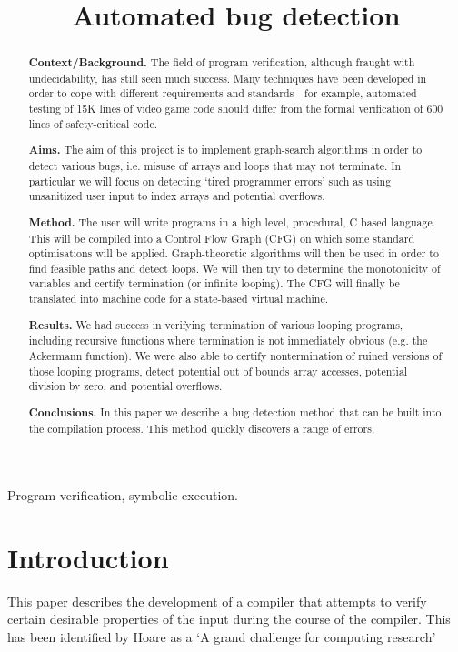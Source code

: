 \documentclass[12pt,a4paper]{article}
\title{Automated bug detection}
\author{} %
\date{}
\begin{document}
\maketitle

\begin{abstract}
\par
{\bf Context/Background.} The field of program verification, although fraught with undecidability, has still seen much success. Many techniques have been developed in order to
cope with different requirements and standards - for example, automated testing of 15K lines of video game code should differ from the formal verification of 600 lines
of safety-critical code.

{\bf Aims.} The aim of this project is to implement graph-search algorithms in order to detect various bugs, i.e. misuse of arrays and loops that may not terminate. In particular we will focus on detecting `tired programmer errors' such as using unsanitized user input to index arrays and potential overflows.

{\bf Method.} The user will write programs in a high level, procedural, C based language. This will be compiled into a Control Flow Graph (CFG) on which some standard
optimisations will be applied. Graph-theoretic algorithms will then be used in order to find feasible paths and detect loops.
We will then try to determine the monotonicity of variables and certify termination (or 
infinite looping). The CFG will finally be translated into machine code for a state-based virtual machine.

{\bf Results.} We had success in verifying termination of various looping programs, including recursive functions where termination is not immediately obvious (e.g. the Ackermann function). We were also able to certify nontermination of ruined versions of those looping programs, detect potential out of bounds array accesses, potential division by zero, and potential overflows.

{\bf Conclusions.} In this paper we describe a bug detection method that can be built into the compilation process. This method quickly discovers a range of errors.
\end{abstract}

\begin{keywords}
Program verification, symbolic execution.
\end{keywords}

\section{Introduction}
This paper describes the development of a compiler that attempts to verify certain desirable properties of the input during the course of the compiler.
This has been identified by Hoare as a `A grand challenge for computing research' \cite{hoare} 
\end{document}
